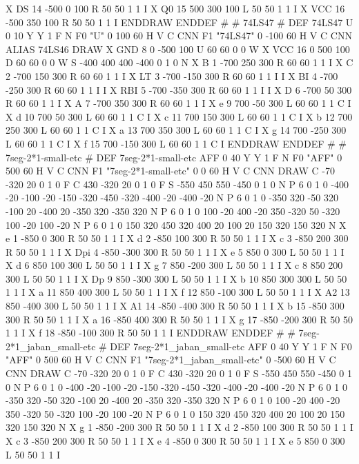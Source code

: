 X DS 14 -500 0 100 R 50 50 1 1 I
X Q0 15 500 300 100 L 50 50 1 1 I
X VCC 16 -500 350 100 R 50 50 1 1 I
ENDDRAW
ENDDEF
#
# 74LS47
#
DEF 74LS47 U 0 10 Y Y 1 F N
F0 "U" 0 100 60 H V C CNN
F1 "74LS47" 0 -100 60 H V C CNN
ALIAS 74LS46
DRAW
X GND 8 0 -500 100 U 60 60 0 0 W
X VCC 16 0 500 100 D 60 60 0 0 W
S -400 400 400 -400 0 1 0 N
X B 1 -700 250 300 R 60 60 1 1 I
X C 2 -700 150 300 R 60 60 1 1 I
X LT 3 -700 -150 300 R 60 60 1 1 I I
X BI 4 -700 -250 300 R 60 60 1 1 I I
X RBI 5 -700 -350 300 R 60 60 1 1 I I
X D 6 -700 50 300 R 60 60 1 1 I
X A 7 -700 350 300 R 60 60 1 1 I
X e 9 700 -50 300 L 60 60 1 1 C I
X d 10 700 50 300 L 60 60 1 1 C I
X c 11 700 150 300 L 60 60 1 1 C I
X b 12 700 250 300 L 60 60 1 1 C I
X a 13 700 350 300 L 60 60 1 1 C I
X g 14 700 -250 300 L 60 60 1 1 C I
X f 15 700 -150 300 L 60 60 1 1 C I
ENDDRAW
ENDDEF
#
# 7seg-2*1-small-etc
#
DEF 7seg-2*1-small-etc AFF 0 40 Y Y 1 F N
F0 "AFF" 0 500 60 H V C CNN
F1 "7seg-2*1-small-etc" 0 0 60 H V C CNN
DRAW
C -70 -320 20 0 1 0 F
C 430 -320 20 0 1 0 F
S -550 450 550 -450 0 1 0 N
P 6 0 1 0  -400 -20  -100 -20  -150 -320  -450 -320  -400 -20  -400 -20 N
P 6 0 1 0  -350 320  -50 320  -100 20  -400 20  -350 320  -350 320 N
P 6 0 1 0  100 -20  400 -20  350 -320  50 -320  100 -20  100 -20 N
P 6 0 1 0  150 320  450 320  400 20  100 20  150 320  150 320 N
X e 1 -850 0 300 R 50 50 1 1 I
X d 2 -850 100 300 R 50 50 1 1 I
X c 3 -850 200 300 R 50 50 1 1 I
X Dpi 4 -850 -300 300 R 50 50 1 1 I
X e 5 850 0 300 L 50 50 1 1 I
X d 6 850 100 300 L 50 50 1 1 I
X g 7 850 -200 300 L 50 50 1 1 I
X c 8 850 200 300 L 50 50 1 1 I
X Dp 9 850 -300 300 L 50 50 1 1 I
X b 10 850 300 300 L 50 50 1 1 I
X a 11 850 400 300 L 50 50 1 1 I
X f 12 850 -100 300 L 50 50 1 1 I
X A2 13 850 -400 300 L 50 50 1 1 I
X A1 14 -850 -400 300 R 50 50 1 1 I
X b 15 -850 300 300 R 50 50 1 1 I
X a 16 -850 400 300 R 50 50 1 1 I
X g 17 -850 -200 300 R 50 50 1 1 I
X f 18 -850 -100 300 R 50 50 1 1 I
ENDDRAW
ENDDEF
#
# 7seg-2*1_jaban_small-etc
#
DEF 7seg-2*1_jaban_small-etc AFF 0 40 Y Y 1 F N
F0 "AFF" 0 500 60 H V C CNN
F1 "7seg-2*1_jaban_small-etc" 0 -500 60 H V C CNN
DRAW
C -70 -320 20 0 1 0 F
C 430 -320 20 0 1 0 F
S -550 450 550 -450 0 1 0 N
P 6 0 1 0  -400 -20  -100 -20  -150 -320  -450 -320  -400 -20  -400 -20 N
P 6 0 1 0  -350 320  -50 320  -100 20  -400 20  -350 320  -350 320 N
P 6 0 1 0  100 -20  400 -20  350 -320  50 -320  100 -20  100 -20 N
P 6 0 1 0  150 320  450 320  400 20  100 20  150 320  150 320 N
X g 1 -850 -200 300 R 50 50 1 1 I
X d 2 -850 100 300 R 50 50 1 1 I
X c 3 -850 200 300 R 50 50 1 1 I
X e 4 -850 0 300 R 50 50 1 1 I
X e 5 850 0 300 L 50 50 1 1 I
